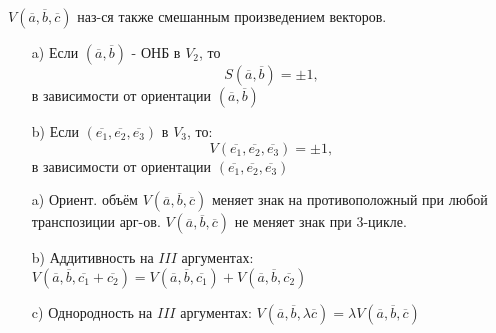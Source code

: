 \begin{note}
$V(\overline{a}, \overline{b}, \overline{c})$ наз-ся также смешанным произведением векторов.
\end{note}

\begin{statement}
\begin{itemize}
  \item [a) ] Если $(\overline{a}, \overline{b})$ - ОНБ в $V_2$, то
    \[
    S(\overline{a}, \overline{b}) = \pm 1,
    \] 
    в зависимости от ориентации $(\overline{a}, \overline{b})$
  \item [b) ] Если $(\overline{e_1}, \overline{e_2}, \overline{e_3})$ в $V_3$, то:
    \[
    V(\overline{e_1}, \overline{e_2}, \overline{e_3}) = \pm 1,
    \] 
    в зависимости от ориентации $(\overline{e_1}, \overline{e_2}, \overline{e_3})$
\end{itemize}
\end{statement}
\begin{theorem}
  \begin{itemize}
    \item [a) ] Ориент. объём $V(\overline{a}, \overline{b}, \overline{c})$ меняет знак на противоположный при любой транспозиции арг-ов.
      $V(\overline{a}, \overline{b}, \overline{c})$ не меняет знак при 3-цикле.
    \item [b) ] Аддитивность на $III$ аргументах: $V(\overline{a}, \overline{b}, \overline{c_1} + \overline{c_2}) = V(\overline{a}, \overline{b}, \overline{c_1}) + V(\overline{a}, \overline{b}, \overline{c_2})$
    \item [c) ] Однородность на $III$ аргументах: $V(\overline{a}, \overline{b}, \lambda\overline{c}) = \lambda V(\overline{a}, \overline{b}, \overline{c})$
  \end{itemize}
\end{theorem}
